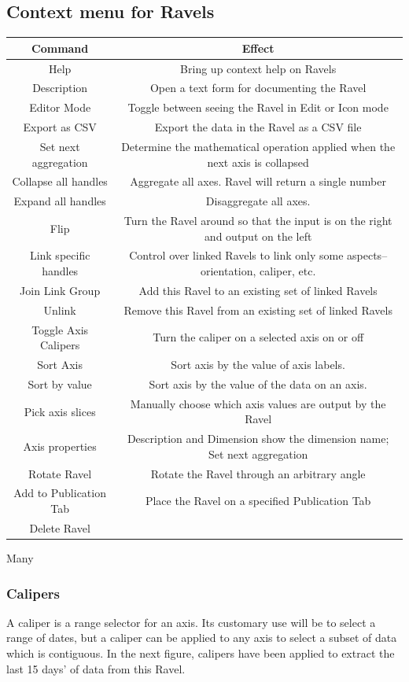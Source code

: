 \subsection{Context menu for Ravels}

\begin{tabular}{|c|c|}
\hline 
Command & Effect\tabularnewline
\hline 
\hline 
Help & Bring up context help on Ravels\tabularnewline
\hline 
Description & Open a text form for documenting the Ravel\tabularnewline
\hline 
Editor Mode & Toggle between seeing the Ravel in Edit or Icon mode\tabularnewline
\hline 
Export as CSV & Export the data in the Ravel as a CSV file\tabularnewline
\hline 
Set next aggregation & Determine the mathematical operation applied when the next axis is
collapsed\tabularnewline
\hline 
Collapse all handles & Aggregate all axes. Ravel will return a single number\tabularnewline
\hline 
Expand all handles & Disaggregate all axes. \tabularnewline
\hline 
Flip & Turn the Ravel around so that the input is on the right and output
on the left\tabularnewline
\hline 
Link specific handles & Control over linked Ravels to link only some aspects--orientation,
caliper, etc.\tabularnewline
\hline 
Join Link Group & Add this Ravel to an existing set of linked Ravels\tabularnewline
\hline 
Unlink & Remove this Ravel from an existing set of linked Ravels\tabularnewline
\hline 
Toggle Axis Calipers & Turn the caliper on a selected axis on or off\tabularnewline
\hline 
Sort Axis & Sort axis by the value of axis labels.\tabularnewline
\hline 
Sort by value & Sort axis by the value of the data on an axis.\tabularnewline
\hline 
Pick axis slices & Manually choose which axis values are output by the Ravel\tabularnewline
\hline 
Axis properties & Description and Dimension show the dimension name; Set next aggregation\tabularnewline
\hline 
Rotate Ravel & Rotate the Ravel through an arbitrary angle\tabularnewline
\hline 
Add to Publication Tab & Place the Ravel on a specified Publication Tab\tabularnewline
\hline 
Delete Ravel & \tabularnewline
\hline 
\end{tabular}

Many

\subsubsection{Calipers}

\label{Calipers}A caliper is a range selector for an axis. Its customary
use will be to select a range of dates, but a caliper can be applied
to any axis to select a subset of data which is contiguous. In the
next figure, calipers have been applied to extract the last 15 days'
of data from this Ravel.

